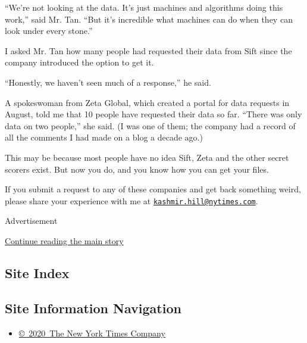 ``We're not looking at the data. It's just machines and algorithms doing
this work,'' said Mr. Tan. ``But it's incredible what machines can do
when they can look under every stone.''

I asked Mr. Tan how many people had requested their data from Sift since
the company introduced the option to get it.

``Honestly, we haven't seen much of a response,'' he said.

A spokeswoman from Zeta Global, which created a portal for data requests
in August, told me that 10 people have requested their data so far.
``There was only data on two people,'' she said. (I was one of them; the
company had a record of all the comments I had made on a blog a decade
ago.)

This may be because most people have no idea Sift, Zeta and the other
secret scorers exist. But now you do, and you know how you can get your
files.

If you submit a request to any of these companies and get back something
weird, please share your experience with me at
\href{mailto:kashmir.hill@nytimes.com}{\nolinkurl{kashmir.hill@nytimes.com}}.

Advertisement

\protect\hyperlink{after-bottom}{Continue reading the main story}

\hypertarget{site-index}{%
\subsection{Site Index}\label{site-index}}

\hypertarget{site-information-navigation}{%
\subsection{Site Information
Navigation}\label{site-information-navigation}}

\begin{itemize}
\tightlist
\item
  \href{https://help.nytimes.com/hc/en-us/articles/115014792127-Copyright-notice}{©~2020~The
  New York Times Company}
\end{itemize}

